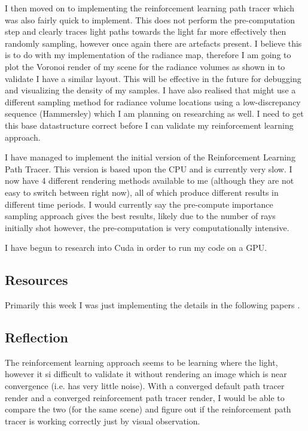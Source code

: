\documentclass[conference]{IEEEtran}
\begin{document}
I then moved on to implementing the reinforcement learning path tracer which was also fairly quick to implement. This does not perform the pre-computation step and clearly traces light paths towards the light far more effectively then randomly sampling, however once again there are artefacts present. I believe this is to do with my implementation of the radiance map, therefore I am going to plot the Voronoi render of my scene for the radiance volumes as shown in \cite{dahm2017learning} to validate I have a similar layout. This will be effective in the future for debugging and visualizing the density of my samples. I have also realised that \cite{dahm2017learning} might use a different sampling method for radiance volume locations using a low-discrepancy sequence  (Hammersley) which I am planning on researching as well. I need to get this base datastructure correct before I can validate my reinforcement learning approach.

I have managed to implement the initial version of the Reinforcement Learning Path Tracer. This version is based upon the CPU and is currently very slow. I now have 4 different rendering methods available to me (although they are not easy to switch between right now), all of which produce different results in different time periods. I would currently say the pre-compute importance sampling approach gives the best results, likely due to the number of rays initially shot however, the pre-computation is very computationally intensive. 

I have begun to research into Cuda in order to run my code on a GPU.

\subsection{Resources}
Primarily this week I was just implementing the details in the following papers \cite{dahm2017learning} \cite{greger1998irradiance} \cite{shirley1994notes}.

\subsection{Reflection}
The reinforcement learning approach seems to be learning where the light, however it si difficult to validate it without rendering an image which is near convergence (i.e. has very little noise). With a converged default path tracer render and a converged reinforcement path tracer render, I would be able to compare the two (for the same scene) and figure out if the reinforcement path tracer is working correctly just by visual observation.
\end{document}
